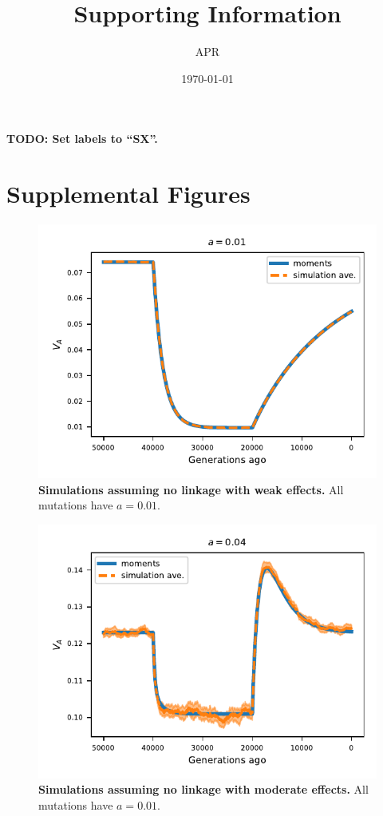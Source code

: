 \documentclass[]{article}
\title{Supporting Information}
\author{APR}
\date{\today}
\begin{document}
\maketitle

\textbf{TODO: Set labels to ``SX''.}

\section{Supplemental Figures}

\begin{figure}[ht!]
    \centering
    \includegraphics{../figures/one_pop.a_0.01.pdf}
    \caption{
        \textbf{Simulations assuming no linkage with weak effects.}
        All mutations have $a=0.01$.
    }
    \label{fig:one-popA}
\end{figure}

\begin{figure}[ht!]
    \centering
    \includegraphics{../figures/one_pop.a_0.04.pdf}
    \caption{
        \textbf{Simulations assuming no linkage with moderate effects.}
        All mutations have $a=0.01$.
    }
    \label{fig:one-popB}
\end{figure}
\end{document}
